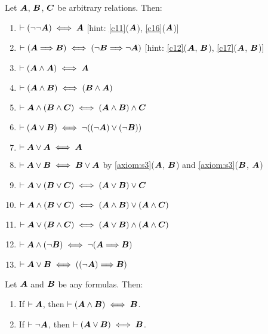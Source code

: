 \begin{dc}\label{c24}%
Let $\boldsymbol{A}$, $\boldsymbol{B}$, $\boldsymbol{C}$ be
arbitrary relations. Then:
\begin{enumerate}
\item $\vdash(\neg\neg\boldsymbol{A})\iff\boldsymbol{A}$ [hint: \ref{c11}($\boldsymbol{A}$),
\ref{c16}($\boldsymbol{A}$)]
\item $\vdash(\boldsymbol{A}\Longrightarrow\boldsymbol{B})\iff(\neg\boldsymbol{B}\Longrightarrow\neg\boldsymbol{A})$
[hint: \ref{c12}($\boldsymbol{A}$, $\boldsymbol{B}$),
  \ref{c17}($\boldsymbol{A}$, $\boldsymbol{B}$)]
\item $\vdash(\boldsymbol{A}\land\boldsymbol{A})\iff\boldsymbol{A}$
\item $\vdash(\boldsymbol{A}\land\boldsymbol{B})\iff(\boldsymbol{B}\land\boldsymbol{A})$
\item $\vdash\boldsymbol{A}\land(\boldsymbol{B}\land\boldsymbol{C})\iff(\boldsymbol{A}\land\boldsymbol{B})\land\boldsymbol{C}$
\item $\vdash(\boldsymbol{A}\lor\boldsymbol{B})\iff\neg((\neg\boldsymbol{A})\lor(\neg\boldsymbol{B}))$
\item $\vdash\boldsymbol{A}\lor\boldsymbol{A}\iff\boldsymbol{A}$
\item $\vdash\boldsymbol{A}\lor\boldsymbol{B}\iff\boldsymbol{B}\lor\boldsymbol{A}$
by \ref{axiom:s3}($\boldsymbol{A}$, $\boldsymbol{B}$) and \ref{axiom:s3}($\boldsymbol{B}$, $\boldsymbol{A}$)
\item $\vdash\boldsymbol{A}\lor(\boldsymbol{B}\lor\boldsymbol{C})\iff(\boldsymbol{A}\lor\boldsymbol{B})\lor\boldsymbol{C}$
\item $\vdash\boldsymbol{A}\land(\boldsymbol{B}\lor\boldsymbol{C})\iff(\boldsymbol{A}\land\boldsymbol{B})\lor(\boldsymbol{A}\land\boldsymbol{C})$
\item $\vdash\boldsymbol{A}\lor(\boldsymbol{B}\land\boldsymbol{C})\iff(\boldsymbol{A}\lor\boldsymbol{B})\land(\boldsymbol{A}\land\boldsymbol{C})$
\item $\vdash\boldsymbol{A}\land(\neg\boldsymbol{B})\iff\neg(\boldsymbol{A}\Longrightarrow\boldsymbol{B})$
\item $\vdash\boldsymbol{A}\lor\boldsymbol{B}\iff((\neg\boldsymbol{A})\Longrightarrow\boldsymbol{B})$
\end{enumerate}
\end{dc}

\begin{dc}\label{c25}%
Let $\boldsymbol{A}$ and $\boldsymbol{B}$ be any formulas. Then:
\begin{enumerate}
\item If $\vdash\boldsymbol{A}$, then $\vdash(\boldsymbol{A}\land\boldsymbol{B})\iff\boldsymbol{B}$.
\item If $\vdash\neg\boldsymbol{A}$, then $\vdash(\boldsymbol{A}\lor\boldsymbol{B})\iff\boldsymbol{B}$.
\end{enumerate}
\end{dc}
